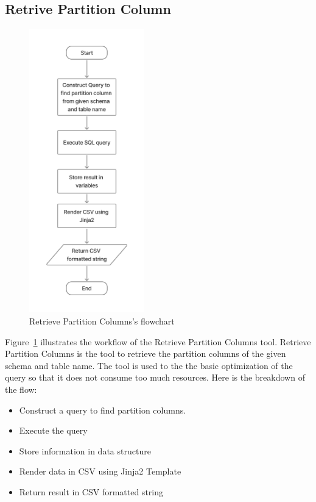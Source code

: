    \subsection{Retrive Partition Column}
    \begin{figure}[H]
        \centering
        \includegraphics[width=5cm]{chapters/3/figures/partition_columns.jpg}
        \caption[Retrieve Partition Columns’s flowchart]{Retrieve Partition Columns’s flowchart}
        \label{fig:partition_column}
    \end{figure}
    Figure~\ref{fig:partition_column} illustrates the workflow of the Retrieve Partition Columns tool. Retrieve Partition Columns is the tool to retrieve the partition columns of the given schema and table name. The tool is used to the the basic optimization of the query so that it does not consume too much resources.
    Here is the breakdown of the flow:
    \begin{itemize}
        \item  Construct a query to find partition columns.
        \item  Execute the query
        \item  Store information in data structure
        \item  Render data in CSV using Jinja2 Template
        \item  Return result in CSV formatted string
    \end{itemize}

